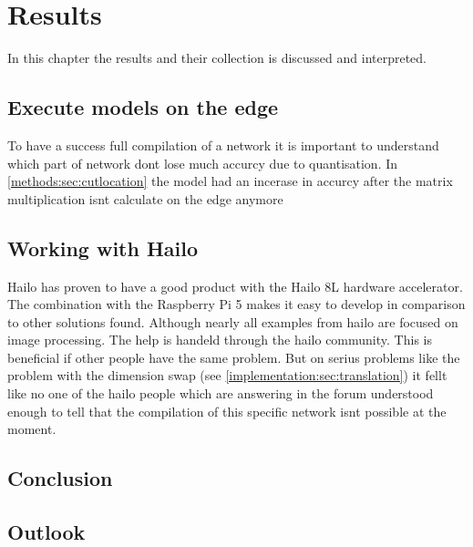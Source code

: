 \chapter{Results}
In this chapter the results and their collection is discussed and interpreted.







\section{Execute models on the edge}
To have a success full compilation of a network it is important to understand which part of network dont lose much accurcy due to quantisation.
In \cref{methods:sec:cutlocation} the model had an incerase in accurcy after the matrix multiplication isnt calculate on the edge anymore

\section{Working with Hailo}

Hailo has proven to have a good product with the Hailo 8L hardware accelerator.
The combination with the Raspberry Pi 5 makes it easy to develop in comparison to other solutions found.
Although nearly all examples from hailo are focused on image processing.
The help is handeld through the hailo community.
This is beneficial if other people have the same problem.
But on serius problems like the problem with the dimension swap (see \cref{implementation:sec:translation}) it fellt like no one of the hailo people which are answering in the forum understood enough to tell that the compilation of this specific network isnt possible at the moment.



\section{Conclusion}

\section{Outlook}
